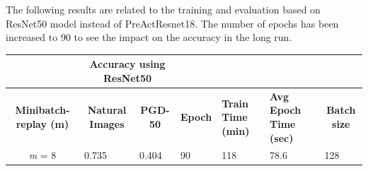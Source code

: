 \documentclass{article}
\begin{document}
The following results are related to the training and evaluation based on
ResNet50 model instead of PreActResnet18. The number of epochs has been
increased to 90 to see the impact on the accuracy in the long run. 




\begin{table}[hbt!]
\centering
\begin{tabular}{|c|c|l|l|l|l|l|}
\hline
\multicolumn{1}{|l|}{}        & \multicolumn{2}{c|}{\textbf{Accuracy using
ResNet50}}                               & \multicolumn{3}{l|}{\textbf{}}
& \textbf{}                                \\ \hline
\textbf{Minibatch-replay (m)} & \textbf{Natural Images}                      &
\multicolumn{1}{c|}{\textbf{PGD-50}} & \multicolumn{1}{c|}{\textbf{Epoch}} &
\multicolumn{1}{p{1.5cm}|}{\textbf{Train Time (min)}} &
\multicolumn{1}{p{1.5cm}|}{\textbf{Avg Epoch Time (sec)}} &
\multicolumn{1}{c|}{\textbf{Batch size}} \\ \hline
\textit{m} = 8       & \multicolumn{1}{l|}{0.735} & { 0.404}         & { 90}           &
{ 118}                     & { 78.6}                        & { 128}
\\ \hline
\end{tabular}
\end{table}
\end{document}
